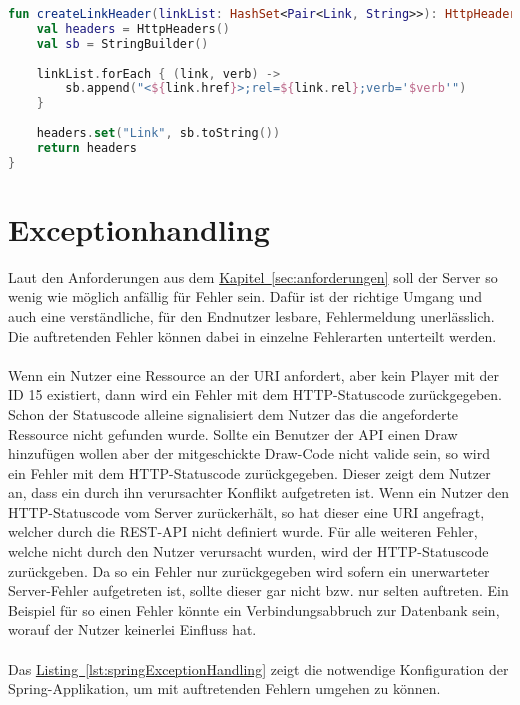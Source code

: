 \begin{lstlisting}[style=lstStyleFramed, language=Kotlin, caption={Implementierung: \enquote{Links zu String} Parse-Funktion}, label=lst:createLinkHeader, float]
fun createLinkHeader(linkList: HashSet<Pair<Link, String>>): HttpHeaders {
	val headers = HttpHeaders()
	val sb = StringBuilder()
	
	linkList.forEach { (link, verb) ->
		sb.append("<${link.href}>;rel=${link.rel};verb='$verb'")
	}
	
	headers.set("Link", sb.toString())
	return headers
}
\end{lstlisting}

\section{Exceptionhandling}
Laut den Anforderungen aus dem \hyperref[sec:anforderungen]{Kapitel~\ref{sec:anforderungen}} soll der Server so wenig wie möglich anfällig für Fehler sein. Dafür ist der richtige Umgang und auch eine verständliche, für den Endnutzer lesbare, Fehlermeldung unerlässlich. Die auftretenden Fehler können dabei in einzelne Fehlerarten unterteilt werden.\\
\\
Wenn ein Nutzer eine Ressource an der \gls{URI}  anfordert, aber kein Player mit der ID 15 existiert, dann wird ein Fehler mit dem \gls{HTTP}-Statuscode  zurückgegeben. Schon der Statuscode alleine signalisiert dem Nutzer das die angeforderte Ressource nicht gefunden wurde. Sollte ein Benutzer der \gls{API} einen Draw hinzufügen wollen aber der mitgeschickte Draw-Code nicht valide sein, so wird ein Fehler mit dem \gls{HTTP}-Statuscode  zurückgegeben. Dieser zeigt dem Nutzer an, dass ein durch ihn verursachter Konflikt aufgetreten ist. Wenn ein Nutzer den \gls{HTTP}-Statuscode  vom Server zurückerhält, so hat dieser eine \gls{URI} angefragt, welcher durch die \gls{REST}-\gls{API} nicht definiert wurde. Für alle weiteren Fehler, welche nicht durch den Nutzer verursacht wurden, wird der \gls{HTTP}-Statuscode  zurückgeben. Da so ein Fehler nur zurückgegeben wird sofern ein unerwarteter Server-Fehler aufgetreten ist, sollte dieser gar nicht bzw. nur selten auftreten. Ein Beispiel für so einen Fehler könnte ein Verbindungsabbruch zur Datenbank sein, worauf der Nutzer keinerlei Einfluss hat.\\
\\
Das \hyperref[lst:springExceptionHandling]{Listing~\ref{lst:springExceptionHandling}} zeigt die notwendige Konfiguration der Spring-Applikation, um mit auftretenden Fehlern umgehen zu können.\\
